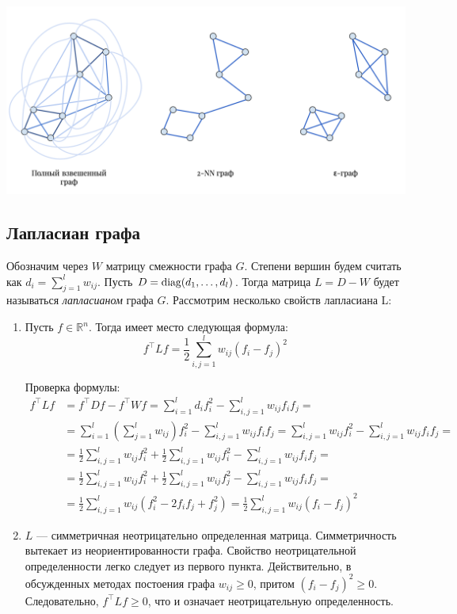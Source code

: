 \documentclass[12pt,fleqn]{article}
\begin{document}
\includegraphics[scale=0.5]{graphs.png}

\subsection{Лапласиан графа}

Обозначим через $W$ матрицу смежности графа $G$. Степени вершин будем считать как $d_i=\sum_{j=1}^{l}w_{ij}$. Пусть $D=\mathop{\mathrm{diag}}(d_1, \dots, d_l)$. Тогда матрица $L=D-W$ будет называться {\it лапласианом} графа $G$. Рассмотрим несколько свойств лапласиана L:

\begin{enumerate}
   \item Пусть $f \in \mathbb R^n$. Тогда имеет место следующая формула:
\[
f^\intercal L f = \frac12 \sum_{i,j=1}^{l}w_{ij}(f_i - f_j)^2
\]

Проверка формулы:
\begin{align*}
f^\intercal L f &= f^\intercal D f - f^\intercal W f = \sum_{i=1}^l d_i f_i^2 - \sum_{i, j = 1}^l w_{ij} f_i f_j = \\
&= \sum_{i=1}^l \left( \sum_{j=1}^l w_{ij} \right) f_i^2 - \sum_{i, j = 1}^l w_{ij} f_i f_j = \sum_{i, j = 1}^l w_{ij} f_i^2 - \sum_{i, j = 1}^l w_{ij} f_i f_j = \\
&= \frac{1}{2} \sum_{i, j = 1}^l w_{ij} f_i^2 + \frac{1}{2} \sum_{i, j = 1}^l w_{ij} f_i^2 - \sum_{i, j = 1}^l w_{ij} f_i f_j = \\
&= \frac{1}{2} \sum_{i, j = 1}^l w_{ij} f_i^2 + \frac{1}{2} \sum_{i, j = 1}^l w_{ij} f_j^2 - \sum_{i, j = 1}^l w_{ij} f_i f_j = \\
&= \frac{1}{2} \sum_{i, j = 1}^l w_{ij}\left(f_i^2 - 2 f_i f_j + f_j^2\right) = \frac{1}{2} \sum_{i, j = 1}^l w_{ij} {\left(f_i - f_j\right)}^2
\end{align*}

   \item $L$ --- симметричная неотрицательно определенная матрица. Симметричность вытекает из неориентированности графа. Свойство неотрицательной определенности легко следует из первого пункта. Действительно, в обсужденных методах постоения графа $w_{ij} \ge 0$, притом $(f_i - f_j)^2 \ge 0$. Следовательно, $f^\intercal L f \ge 0$, что и означает неотрицательную определенность.
   
\end{enumerate}
\end{document}
